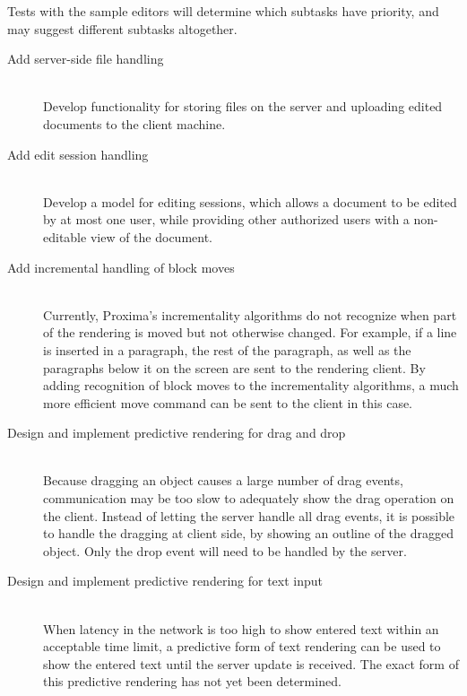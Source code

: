 \documentclass[10pt]{article}
\begin{document}
Tests with the sample editors will determine which subtasks have priority, and may suggest different subtasks altogether.

\begin{description}
\item[Add server-side file handling]~\\
Develop functionality for storing files on the server and uploading edited documents to the client machine.

\item[Add edit session handling]~\\
Develop a model for editing sessions, which allows a document to be edited by at most one user, while providing other authorized users with a non-editable view of the document.

\item[Add incremental handling of block moves]~\\
Currently, Proxima's incrementality algorithms do not recognize when part of the rendering is moved but not otherwise changed. For example, if a line is inserted in a paragraph, the rest of the paragraph, as well as the paragraphs below it on the screen are sent to the rendering client. By adding recognition of block moves to the incrementality algorithms, a much more efficient move command can be sent to the client in this case.
 
\item[Design and implement predictive rendering for drag and drop]~\\
Because dragging an object causes a large number of drag events, communication may be too slow to adequately show the drag operation on the client. Instead of letting the server handle all drag events, it is possible to handle the dragging at client side, by showing an outline of the dragged object. Only the drop event will need to be handled by the server.

\item[Design and implement predictive rendering for text input]~\\
When latency in the network is too high to show entered text within an acceptable time limit, a predictive form of text rendering can be used to show the entered text until the server update is received. The exact form of this predictive rendering has not yet been determined.

\end{description}
\end{document}

